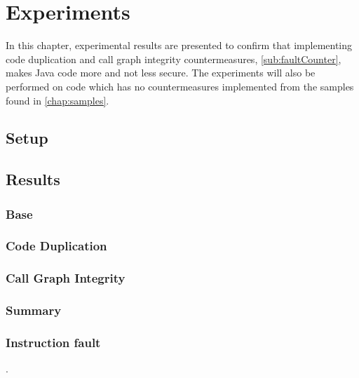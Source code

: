\chapter{Experiments}
In this chapter, experimental results are presented to confirm that implementing code duplication and call graph integrity countermeasures, \cref{sub:faultCounter}, makes Java code more and not less secure. The experiments will also be performed on code which has no countermeasures implemented from the \jc samples found in \cref{chap:samples}.
%
\section{Setup}

\section{Results}

\subsection{Base}

\subsection{Code Duplication}

\subsection{Call Graph Integrity}

\subsection{Summary}

\subsection{Instruction fault}
.
